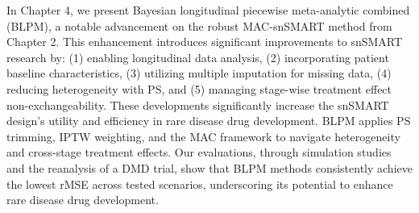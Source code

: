 In Chapter 4, we present Bayesian longitudinal piecewise meta-analytic combined (\ac{BLPM}), a notable advancement on the robust MAC-snSMART method from Chapter 2. This enhancement introduces significant improvements to \ac{snSMART} research by: (1) enabling longitudinal data analysis, (2) incorporating patient baseline characteristics, (3) utilizing multiple imputation for missing data, (4) reducing heterogeneity with \ac{PS}, and (5) managing stage-wise treatment effect non-exchangeability. These developments significantly increase the snSMART design's utility and efficiency in rare disease drug development. \ac{BLPM} applies \ac{PS} trimming, \ac{IPTW} weighting, and the \ac{MAC} framework to navigate heterogeneity and cross-stage treatment effects. Our evaluations, through simulation studies and the reanalysis of a \ac{DMD} trial, show that \ac{BLPM} methods consistently achieve the lowest \ac{rMSE} across tested scenarios, underscoring its potential to enhance rare disease drug development.



